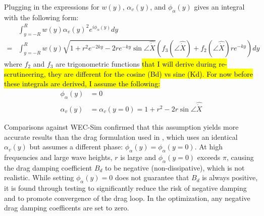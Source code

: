 Plugging in the expressions for $w(y)$, $\alpha_v(y)$, and $\phi_\alpha(y)$ gives an integral with the following form:
\begin{equation}
\begin{aligned}
    &\int_{y=-R}^{R} w(y) \alpha_v(y)^2  e^{i\phi_\alpha(y)}dy \\
    = &\int_{y=-R}^{R} w(y) \sqrt{1 + r^2 e^{-2ky} - 2 r e^{-ky}  \sin\angle \hat{\dot{X}}} \left(f_3(\angle\hat{\dot{X}}) + f_2(\angle\hat{\dot{X}})re^{-ky}\right)  dy
\end{aligned}
\end{equation}
where $f_2$ and $f_3$ are trigonometric functions \hl{that I will derive during re-scrutineering, they are different for the cosine (Bd) vs sine (Kd).
For now before these integrals are derived, I assume the following:}
\begin{equation}
\begin{aligned}
    \phi_\alpha(y) &= 0 \\
    \alpha_v(y) &= \alpha_v(y=0) = 1 + r^2 - 2 r \sin\angle \hat{\dot{X}}
\end{aligned}
\end{equation}

Comparisons against WEC-Sim confirmed that this assumption yields more accurate results than the drag formulation used in \cite{quartier_influence_2021}, which uses an identical $\alpha_v(y)$ but assumes a different phase: $\phi_\alpha(y)=\phi_\alpha(y=0)$. 
At high frequencies and large wave heights, $r$ is large and $\phi_\alpha(y=0)$ exceeds $\pi$, causing the drag damping coefficient $B_d$ to be negative (non-dissipative), which is not realistic.
While setting $\phi_\alpha(y)=0$ does not guarantee that $B_d$ is always positive, it is found through testing to significantly reduce the risk of negative damping and to promote convergence of the drag loop.
In the optimization, any negative drag damping coefficents are set to zero.


